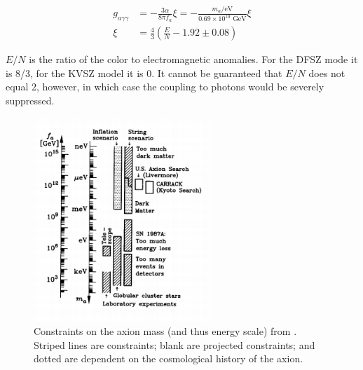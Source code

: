 \documentclass[12pt,twosides]{book}
\begin{document}
\begin{align*}
g_{a\gamma\gamma} &= -\frac{3\alpha}{8\pi f_a}\xi = - \frac{m_a/\text{eV}}{0.69\times10^{10}\text{ GeV}}\xi 
\\ \xi &= \frac{4}{3}(\frac{E}{N} - 1.92 \pm 0.08)
\end{align*}

$E/N$ is the ratio of the color to electromagnetic anomalies. For the DFSZ mode it is 8/3, for the KVSZ model it is 0. It cannot be guaranteed that $E/N$ does not equal 2, however, in which case the coupling to photons would be severely suppressed.

\begin{figure}
\centering
\includegraphics[width=0.6\textwidth]{1dexclusionlimit}
\caption{Constraints on the axion mass (and thus energy scale) from \cite{raffelt80}. Striped lines are constraints; blank are projected constraints; and dotted are dependent on the cosmological history of the axion.}
\end{figure}
\end{document}
